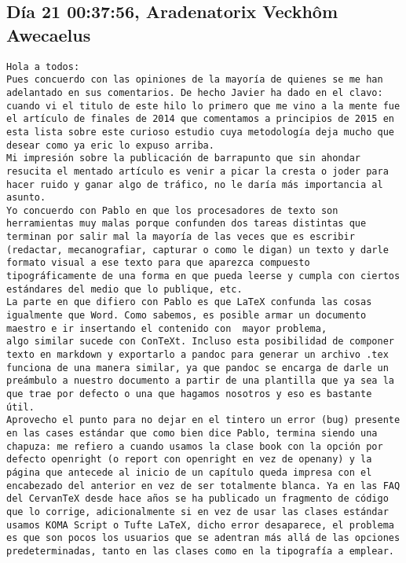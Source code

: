 \documentclass[a4paper,10pt]{article}
\begin{document}
\subsection{Día 21 00:37:56, Aradenatorix Veckhôm Awecaelus}

\begin{lstlisting}
Hola a todos:
Pues concuerdo con las opiniones de la mayoría de quienes se me han
adelantado en sus comentarios. De hecho Javier ha dado en el clavo:
cuando vi el titulo de este hilo lo primero que me vino a la mente fue
el artículo de finales de 2014 que comentamos a principios de 2015 en
esta lista sobre este curioso estudio cuya metodología deja mucho que
desear como ya eric lo expuso arriba.
Mi impresión sobre la publicación de barrapunto que sin ahondar
resucita el mentado artículo es venir a picar la cresta o joder para
hacer ruido y ganar algo de tráfico, no le daría más importancia al
asunto.
Yo concuerdo con Pablo en que los procesadores de texto son
herramientas muy malas porque confunden dos tareas distintas que
terminan por salir mal la mayoría de las veces que es escribir
(redactar, mecanografiar, capturar o como le digan) un texto y darle
formato visual a ese texto para que aparezca compuesto
tipográficamente de una forma en que pueda leerse y cumpla con ciertos
estándares del medio que lo publique, etc.
La parte en que difiero con Pablo es que LaTeX confunda las cosas
igualmente que Word. Como sabemos, es posible armar un documento
maestro e ir insertando el contenido con  mayor problema,
algo similar sucede con ConTeXt. Incluso esta posibilidad de componer
texto en markdown y exportarlo a pandoc para generar un archivo .tex
funciona de una manera similar, ya que pandoc se encarga de darle un
preámbulo a nuestro documento a partir de una plantilla que ya sea la
que trae por defecto o una que hagamos nosotros y eso es bastante
útil.
Aprovecho el punto para no dejar en el tintero un error (bug) presente
en las cases estándar que como bien dice Pablo, termina siendo una
chapuza: me refiero a cuando usamos la clase book con la opción por
defecto openright (o report con openright en vez de openany) y la
página que antecede al inicio de un capítulo queda impresa con el
encabezado del anterior en vez de ser totalmente blanca. Ya en las FAQ
del CervanTeX desde hace años se ha publicado un fragmento de código
que lo corrige, adicionalmente si en vez de usar las clases estándar
usamos KOMA Script o Tufte LaTeX, dicho error desaparece, el problema
es que son pocos los usuarios que se adentran más allá de las opciones
predeterminadas, tanto en las clases como en la tipografía a emplear.

\end{lstlisting}
\end{document}
